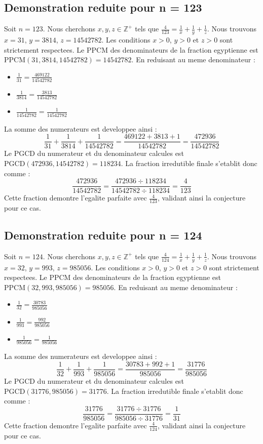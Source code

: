 \documentclass[11pt,a4paper]{article}
\begin{document}
\subsection{Demonstration reduite pour n = 123}
Soit $n = 123$. Nous cherchons $x, y, z \in \mathbb{Z}^{+}$ tels que $\frac{4}{123} = \frac{1}{x} + \frac{1}{y} + \frac{1}{z}$.
Nous trouvons $x = 31$, $y = 3814$, $z = 14542782$.
Les conditions $x > 0$, $y > 0$ et $z > 0$ sont strictement respectees.
Le PPCM des denominateurs de la fraction egyptienne est $\text{PPCM}(31, 3814, 14542782) = 14542782$.
En reduisant au meme denominateur :
\begin{itemize}
    \item $\frac{1}{31} = \frac{469122}{14542782}$
    \item $\frac{1}{3814} = \frac{3813}{14542782}$
    \item $\frac{1}{14542782} = \frac{1}{14542782}$
\end{itemize}
La somme des numerateurs est developpee ainsi :
$$ \frac{1}{31} + \frac{1}{3814} + \frac{1}{14542782} = \frac{469122 + 3813 + 1}{14542782} = \frac{472936}{14542782} $$
Le PGCD du numerateur et du denominateur calcules est $\text{PGCD}(472936, 14542782) = 118234$.
La fraction irredutible finale s'etablit donc comme :
$$ \frac{472936}{14542782} = \frac{472936 \div 118234}{14542782 \div 118234} = \frac{4}{123} $$
Cette fraction demontre l'egalite parfaite avec $\frac{4}{123}$, validant ainsi la conjecture pour ce cas.

\subsection{Demonstration reduite pour n = 124}
Soit $n = 124$. Nous cherchons $x, y, z \in \mathbb{Z}^{+}$ tels que $\frac{4}{124} = \frac{1}{x} + \frac{1}{y} + \frac{1}{z}$.
Nous trouvons $x = 32$, $y = 993$, $z = 985056$.
Les conditions $x > 0$, $y > 0$ et $z > 0$ sont strictement respectees.
Le PPCM des denominateurs de la fraction egyptienne est $\text{PPCM}(32, 993, 985056) = 985056$.
En reduisant au meme denominateur :
\begin{itemize}
    \item $\frac{1}{32} = \frac{30783}{985056}$
    \item $\frac{1}{993} = \frac{992}{985056}$
    \item $\frac{1}{985056} = \frac{1}{985056}$
\end{itemize}
La somme des numerateurs est developpee ainsi :
$$ \frac{1}{32} + \frac{1}{993} + \frac{1}{985056} = \frac{30783 + 992 + 1}{985056} = \frac{31776}{985056} $$
Le PGCD du numerateur et du denominateur calcules est $\text{PGCD}(31776, 985056) = 31776$.
La fraction irredutible finale s'etablit donc comme :
$$ \frac{31776}{985056} = \frac{31776 \div 31776}{985056 \div 31776} = \frac{1}{31} $$
Cette fraction demontre l'egalite parfaite avec $\frac{4}{124}$, validant ainsi la conjecture pour ce cas.
\end{document}
